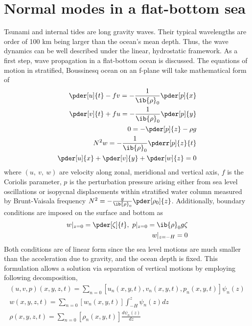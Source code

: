\documentclass[12pt]{article}
\begin{document}
\section{Normal modes in a flat-bottom sea}
Tsunami and internal tides are long gravity waves. Their typical wavelengths are order of 
100 km being larger than the ocean's mean depth. Thus, the wave dynamics can be well described 
under the linear, hydrostatic framework. As a first step, wave propagation in a flat-bottom ocean 
is discussed. The equations of motion in stratified, Boussinesq ocean on an f-plane 
\citep{kundu2008fluid, cushman2011introduction} will take mathematical form of
\begin{subequations}
	\label{In:Beq}
	\begin{align}
	\pder[u]{t} - f v = -\frac{1}{\ib{\rho}_0}\pder[p]{x}\\
	\pder[v]{t} + f u = -\frac{1}{\ib{\rho}_0}\pder[p]{y}\\
	0 = -\pder[p]{z} - \rho g\\
	N^2 w = -\frac{1}{\ib{\rho}_0} \pderr[p]{z}{t}\\
	\pder[u]{x} + \pder[v]{y} + \pder[w]{z} = 0
	\end{align}
\end{subequations}
where $(u,~v,~w)$ are velocity along zonal, meridional and vertical axis, $f$ is the Coriolis 
parameter, $p$ is the perturbation pressure arising either from sea level oscillations or isopycnal 
displacements within stratified water column measured by Brunt-Vaisala frequency $N^2 = 
-\frac{g}{\ib{\rho}_0}\pder[\rho_0]{z}$. Additionally, boundary conditions are imposed on the 
surface and bottom as
\begin{align}
w|_{z = 0} = \pder[\zeta]{t},~p|_{z = 0} = \ib{\rho}_0 g \zeta\\
w|_{z = -H} = 0\label{In:bc.swe}
\end{align}
Both conditions are of linear form since the sea level motions are much smaller than the 
acceleration due to gravity, and the ocean depth is fixed. This formulation allows a solution via 
separation of vertical motions by employing following decomposition,
\begin{align}
(u, v, p)(x,y,z,t) = \sum_{n = 0} [u_n(x,y,t), v_n(x,y,t), p_n(x,y,t)]\psi_n(z)\\
w(x,y,z,t) = \sum_{n = 0} [w_n(x,y,t)] \int_{-H}^z \psi_n(z) dz\\
\rho(x,y,z,t) = \sum_{n = 0} [\rho_n(x,y,t)] \frac{d \psi_n(z)}{dz}
\end{align}
\end{document}
